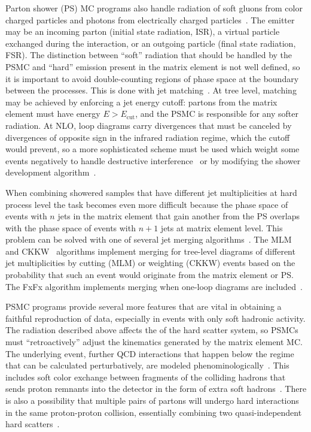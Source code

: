 Parton shower (PS) MC programs also handle radiation of soft gluons from color charged particles and photons from electrically charged particles~\cite{Sjostrand:2004ef}.
The emitter may be an incoming parton (initial state radiation, ISR), a virtual particle exchanged during the interaction, or an outgoing particle (final state radiation, FSR).
The distinction between ``soft'' radiation that should be handled by the PSMC and ``hard'' emission present in the matrix element is not well defined, so it is important to avoid double-counting regions of phase space at the boundary between the processes.
This is done with jet matching~\cite{Alwall:2014hca,Olive:2016xmw}.
At tree level, matching may be achieved by enforcing a jet energy cutoff: partons from the matrix element must have energy $E > E_\text{cut}$, and the PSMC is responsible for any softer radiation.
At NLO, loop diagrams carry divergences that must be canceled by divergences of opposite sign in the infrared radiation regime, which the cutoff would prevent, so a more sophisticated scheme must be used which weight some events negatively to handle destructive interference~\cite{Alwall:2014hca} or by modifying the shower development algorithm~\cite{Nason:2004rx,Frixione:2007vw}.

When combining showered samples that have different jet multiplicities at hard process level the task becomes even more difficult because the phase space of events with $n$ jets in the matrix element that gain another from the PS overlaps with the phase space of events with $n+1$ jets at matrix element level.
This problem can be solved with one of several jet merging algorithms~\cite{Alwall:2007fs,Alwall:2008qv,Alwall:2014hca,Rauch:2016pai}.
The MLM~\cite{Mangano:2006rw} and CKKW~\cite{Catani:2001cc} algorithms implement merging for tree-level diagrams of different jet multiplicities by cutting (MLM) or weighting (CKKW) events based on the probability that such an event would originate from the matrix element or PS\@.
The FxFx algorithm implements merging when one-loop diagrams are included~\cite{Frederix:2012ps}.

PSMC programs provide several more features that are vital in obtaining a faithful reproduction of data, especially in events with only soft hadronic activity.
The radiation described above affects the {\pt} of the hard scatter system, so PSMCs must ``retroactively'' adjust the kinematics generated by the matrix element MC\@.
The underlying event, further QCD interactions that happen below the regime that can be calculated perturbatively, are modeled phenominologically~\cite{Olive:2016xmw,Sjostrand:2014zea}.
This includes soft color exchange between fragments of the colliding hadrons that sends proton remnants into the detector in the form of extra soft hadrons~\cite{Sjostrand:2004pf}.
There is also a possibility that multiple pairs of partons will undergo hard interactions in the same proton-proton collision, essentially combining two quasi-independent hard scatters~\cite{Sjostrand:2004ef,Manohar:2012jr}.


